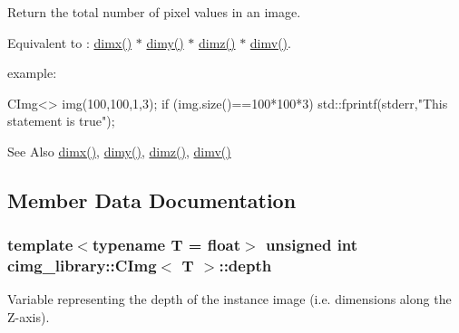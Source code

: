 Return the total number of pixel values in an image. 


\begin{DoxyItemize}
\item Equivalent to \-: \hyperlink{structcimg__library_1_1_c_img_abf1a3c383880a20428b2ea9d22f3c06e}{dimx()} $\ast$ \hyperlink{structcimg__library_1_1_c_img_aa1e128f9d950b39ed312eb368741970c}{dimy()} $\ast$ \hyperlink{structcimg__library_1_1_c_img_aba56e96a615d71ed9a71009768fc4b75}{dimz()} $\ast$ \hyperlink{structcimg__library_1_1_c_img_ad30f8300f32a94a80e1e06c84a45de49}{dimv()}.
\end{DoxyItemize}

\begin{DoxyParagraph}{example\-:}

\begin{DoxyCode}
CImg<> img(100,100,1,3);
\textcolor{keywordflow}{if} (img.size()==100*100*3) std::fprintf(stderr,\textcolor{stringliteral}{"This statement is true"});
\end{DoxyCode}
 
\end{DoxyParagraph}
\begin{DoxySeeAlso}{See Also}
\hyperlink{structcimg__library_1_1_c_img_abf1a3c383880a20428b2ea9d22f3c06e}{dimx()}, \hyperlink{structcimg__library_1_1_c_img_aa1e128f9d950b39ed312eb368741970c}{dimy()}, \hyperlink{structcimg__library_1_1_c_img_aba56e96a615d71ed9a71009768fc4b75}{dimz()}, \hyperlink{structcimg__library_1_1_c_img_ad30f8300f32a94a80e1e06c84a45de49}{dimv()} 
\end{DoxySeeAlso}


\subsection{Member Data Documentation}
\hypertarget{structcimg__library_1_1_c_img_a982d5d1e153477adf7f851106fe8ee3a}{
\subsubsection[{depth}]{\setlength{\rightskip}{0pt plus 5cm}template$<$typename T = float$>$ unsigned int {\bf cimg\-\_\-library\-::\-C\-Img}$<$ T $>$\-::depth}}\label{structcimg__library_1_1_c_img_a982d5d1e153477adf7f851106fe8ee3a}


Variable representing the depth of the instance image (i.\-e. dimensions along the Z-\/axis). 

